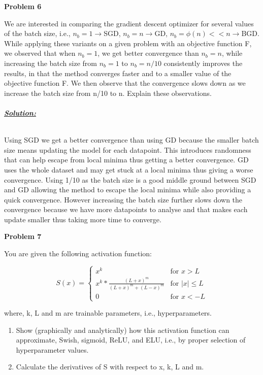 \documentclass{article}
\begin{document}
\newpage
\noindent \textbf{Problem 6}

\noindent We are interested in comparing the gradient descent optimizer for several values of the
batch size, i.e., $n_b=1\rightarrow$SGD, $n_b=n\rightarrow$GD, $n_b=\phi(n)<<n\rightarrow$BGD. While applying these
variants on a given problem with an objective function F, we observed that when $n_b=1$,
we get better convergence than $n_b=n$, while increasing the batch size from $n_b=1$ to
$n_b=n/10$ consistently improves the results, in that the method converges faster and to a
smaller value of the objective function F. We then observe that the convergence slows
down as we increase the batch size from n/10 to n.
Explain these observations. \\ \\

\noindent \underline{\textbf{\textit{Solution:}}}

\noindent \\Using SGD we get a better convergence than using GD because the smaller batch size means updating the model for each datapoint. 
This introduces randomness that can help escape from local minima thus getting a better convergence. 
GD uses the whole dataset and may get stuck at a local minima thus giving a worse convergence. 
Using 1/10 as the batch size is a good middle ground between SGD and GD allowing the method to escape the local minima while also providing a quick convergence.
However increasing the batch size further slows down the convergence because we have more datapoints to analyse and that makes each update smaller thus taking more time to converge.

\newpage
\noindent \textbf{Problem 7}

\noindent You are given the following activation function:
\newline

\[S(x) = \begin{cases}
  x^k & \text{for } x > L \\
  x^k * \frac{(L+x)^m}{(L+x)^m + (L-x)^m} & \text{for } |x| \leq L \\
  0 & \text{for } x < -L
\end{cases}\]

\noindent where, k, L and m are trainable parameters, i.e., hyperparameters.
\begin{enumerate}[label=\Alph*]
  \item Show (graphically and analytically) how this activation function can approximate,
   Swish, sigmoid, ReLU, and ELU, i.e., by proper selection of hyperparameter values.
  \item Calculate the derivatives of S with respect to x, k, L and m. \\ \\
\end{enumerate}
\end{document}
